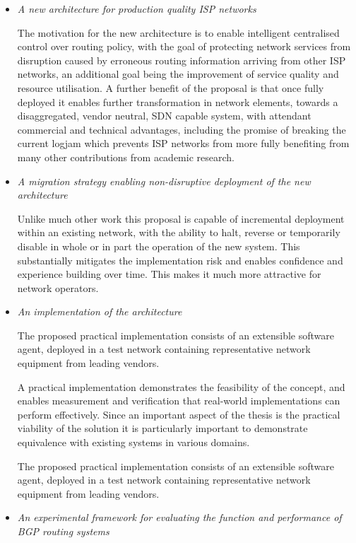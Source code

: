 \begin{itemize}
	\item \textit{A new architecture for production quality ISP networks}

	      The motivation for the new architecture is to enable intelligent centralised control over routing policy, with the goal of protecting network services from disruption caused by erroneous routing information arriving from other ISP networks, an additional goal being the improvement of service quality and resource utilisation. A further benefit of the proposal is that once fully deployed it enables further transformation in network elements, towards a disaggregated, vendor neutral, SDN capable system, with attendant commercial and technical advantages, including the promise of breaking the current logjam which prevents ISP networks from more fully benefiting from many other contributions from academic research.
	\item \textit{A migration strategy enabling non-disruptive deployment of the new architecture}

	      Unlike much other work this proposal is capable of incremental deployment within an existing network, with the ability to halt, reverse or temporarily disable in whole or in part the operation of the new system. This substantially mitigates the implementation risk and enables confidence and experience building over time. This makes it much more attractive for network operators.
	\item \textit{An implementation of the architecture}

	      The proposed practical implementation consists of an extensible software agent, deployed in a test network containing representative network equipment from leading vendors.

	      A practical implementation demonstrates the feasibility of the concept, and enables measurement and verification that real-world implementations can perform effectively. Since an important aspect of the thesis is the practical viability of the solution it is particularly important to demonstrate equivalence with existing systems in various domains.

	      The proposed practical implementation consists of an extensible software agent, deployed in a test network containing representative network equipment from leading vendors.
	\item \textit{An experimental framework for evaluating the function and performance of BGP routing systems}


\end{itemize}
